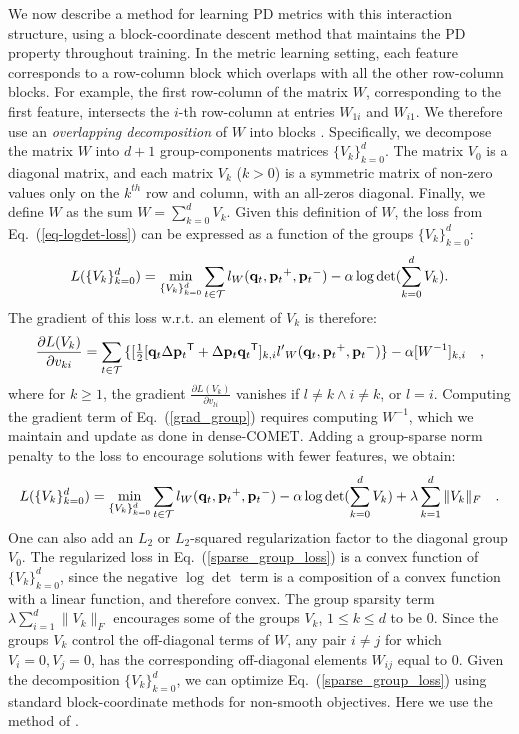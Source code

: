 \documentclass[twoside,11pt]{article}
\newcommand\mat[1]{{#1}}
\renewcommand\vec[1]{\mathbf{#1}}
\newcommand{\T}{{}^\mathsf{T}}
\newcommand{\W}{\mat{W}}
\newcommand{\q}{{\vec{q}}}
\newcommand{\p}{{\vec{p}}}
\newcommand{\trip}{{t}}
\newcommand{\qt}{{\q_{\trip}}}
\newcommand{\pt}{{\p_{\trip}}}
\newcommand{\triplet}{(\qt, \pt^{+}, \pt^{-})}
\newcommand{\Vk}{\mat{V_k}}
\newcommand{\Vg}{\{\Vk\}_{k=0}^{d}} %
\renewcommand{\eqref}[1]{Eq.~(\ref{#1})}
\begin{document}
We now describe a method for learning PD metrics with this interaction structure, using a block-coordinate descent method that maintains the PD property throughout training.
In the metric learning setting, each feature corresponds to a row-column block which overlaps with all the other row-column blocks. For example, the first row-column of the matrix $\W$, corresponding to the first feature, intersects the $i$-th row-column at entries $W_{1i}$ and $W_{i1}$. We therefore use an \emph{overlapping decomposition} of $W$ into blocks \citep{jacob2009group,obozinski2011group}. Specifically,  
we decompose the matrix $\W$ into $d+1$ group-components matrices $\Vg$. The matrix $V_0$ is a diagonal matrix, and each matrix $V_k$ ($k>0$) is a symmetric matrix of non-zero values only on the $k^{th}$ row and column, with an all-zeros diagonal. Finally, we define $\W$ as the sum $\W = \sum_{k=0}^{d}{\Vk}$.
Given this definition of $\W$, the loss from \eqref{eq-logdet-loss} can be expressed as a function of the groups $\Vg$:
\begin{equation}
L(\Vg) = 
  \min_{\Vg} \sum_{\trip \in \cal{T}}   l_{\W}(\qt, \pt^+, \pt^-) - \alpha \log \det(\sum_{k=0}^{d}{\Vk}).
  \label{group_loss}
\end{equation} 
The gradient of this loss w.r.t. an element of $\mat{V}_k$ is therefore:
\begin{equation}
  \frac{\partial {L (V_k)}}{\partial v_{ki}} = \sum\limits_{t\in \cal{T}}{\{
  [\tfrac{1}{2}[\q_{t}\Delta\p_{t}\T + \Delta\p_{t}\q_{t}\T]_{k,i}  }
  {l'}_W\triplet\} - \alpha [\W^{-1}]_{k,i} \quad,
  \label{grad_group}
\end{equation}
where for $k \geq 1$, the gradient $\frac{\partial {L (V_k)}}{\partial v_{li}}$ vanishes if  $l \neq k \wedge i \neq k$, or $l=i$. Computing the gradient term of \eqref{grad_group} requires computing $\W^{-1}$, which we maintain and update as done in dense-COMET.
Adding a group-sparse norm penalty to the loss to encourage solutions with fewer features, we obtain:
\begin{equation}
L(\Vg) = 
  \min_{\Vg} \sum_{\trip \in \cal{T}}   l_{\W}(\qt, \pt^+, \pt^-) - \alpha \log \det(\sum_{k=0}^{d}{\Vk}) + \lambda \sum_{k=1}^d \|V_k\|_F \quad.
  \label{sparse_group_loss}
\end{equation} 
One can also add an $L_2$ or $L_2$-squared regularization factor to the diagonal group $V_0$. The regularized loss in \eqref{sparse_group_loss} is a convex function of $\Vg$, since the negative $\log \det$ term is a composition of a convex function with a linear function, and therefore convex.
The group sparsity term $\lambda \sum_{i=1}^d \|V_k\|_F$ encourages some of the groups $V_k$, $1\leq k \leq d$ to be $0$. Since the groups $V_k$ control the off-diagonal terms of $W$, any pair $i\neq j$ for which  $V_i=0, V_j=0$, has the corresponding off-diagonal elements $W_{ij}$ equal to $0$. Given the decomposition $\Vg$, we can optimize \eqref{sparse_group_loss} using standard block-coordinate methods for non-smooth objectives. Here we use the method of \citet{richtarik2014iteration}. 
\end{document}
